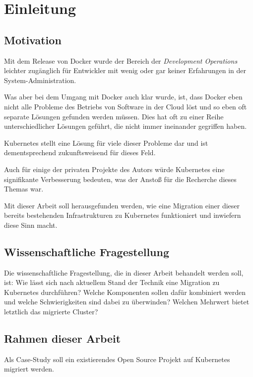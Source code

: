 \chapter{Einleitung}
\label{cha:Einleitung}

\section{Motivation}

Mit dem Release von Docker wurde der Bereich
der \emph{Development Operations}
leichter zugänglich f\"ur Entwickler mit wenig oder gar keiner
Erfahrungen in der System-Administration.

Was aber bei dem Umgang mit Docker auch klar wurde, ist, dass Docker eben nicht
alle Probleme des Betriebs von Software in der Cloud löst und so eben oft
separate
Lösungen gefunden werden müssen. Dies hat oft zu einer Reihe
unterschiedlicher Lösungen geführt, die nicht immer ineinander
gegriffen haben.

Kubernetes stellt eine Lösung für viele dieser Probleme dar und
ist dementsprechend zukunftsweisend f\"ur dieses Feld.

Auch f\"ur einige der privaten Projekte des Autors w\"urde Kubernetes eine
signifikante Verbesserung bedeuten, was der Anstoß f\"ur die Recherche dieses
Themas war.

Mit dieser Arbeit soll herausgefunden werden, wie eine Migration
einer dieser bereits bestehenden
Infrastrukturen zu Kubernetes funktioniert
und inwiefern diese Sinn macht.

\section{Wissenschaftliche Fragestellung}

Die wissenschaftliche Fragestellung, die in dieser Arbeit behandelt werden
soll, ist:
Wie lässt sich nach aktuellem Stand der Technik eine Migration
zu Kubernetes durchführen?
Welche Komponenten sollen dafür kombiniert werden und welche Schwierigkeiten
sind dabei zu überwinden?
Welchen Mehrwert bietet letztlich das migrierte Cluster?

\section{Rahmen dieser Arbeit}

Als Case-Study soll ein existierendes Open Source Projekt auf Kubernetes migriert
werden.

